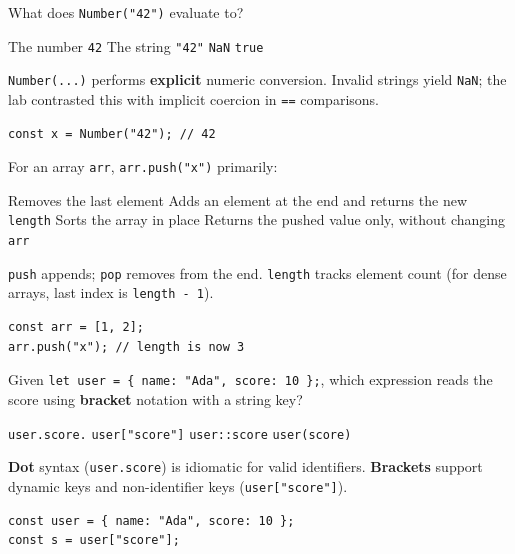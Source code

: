\question[4]
What does \texttt{Number("42")} evaluate to?
\begin{choices}
  \CorrectChoice The number \texttt{42}
  \choice The string \texttt{"42"}
  \choice \texttt{NaN}
  \choice \texttt{true}
\end{choices}
\begin{solution}
  \texttt{Number(...)} performs \textbf{explicit} numeric conversion. Invalid strings yield \texttt{NaN}; the lab contrasted this with implicit coercion in \texttt{==} comparisons.
\begin{lstlisting}[style=js]
const x = Number("42"); // 42
\end{lstlisting}
\end{solution}

\question[4]
For an array \texttt{arr}, \texttt{arr.push("x")} primarily:
\begin{choices}
  \choice Removes the last element
  \CorrectChoice Adds an element at the end and returns the new \texttt{length}
  \choice Sorts the array in place
  \choice Returns the pushed value only, without changing \texttt{arr}
\end{choices}
\begin{solution}
  \texttt{push} appends; \texttt{pop} removes from the end. \texttt{length} tracks element count (for dense arrays, last index is \texttt{length - 1}).
\begin{lstlisting}[style=js]
const arr = [1, 2];
arr.push("x"); // length is now 3
\end{lstlisting}
\end{solution}

\question[4]
Given \texttt{let user = \{ name: "Ada", score: 10 \};}, which expression reads the score using \textbf{bracket} notation with a string key?
\begin{choices}
  \choice \texttt{user.score.}
  \CorrectChoice \texttt{user["score"]}
  \choice \texttt{user::score}
  \choice \texttt{user(score)}
\end{choices}
\begin{solution}
  \textbf{Dot} syntax (\texttt{user.score}) is idiomatic for valid identifiers. \textbf{Brackets} support dynamic keys and non-identifier keys (\texttt{user["score"]}).
\begin{lstlisting}[style=js]
const user = { name: "Ada", score: 10 };
const s = user["score"];
\end{lstlisting}
\end{solution}

